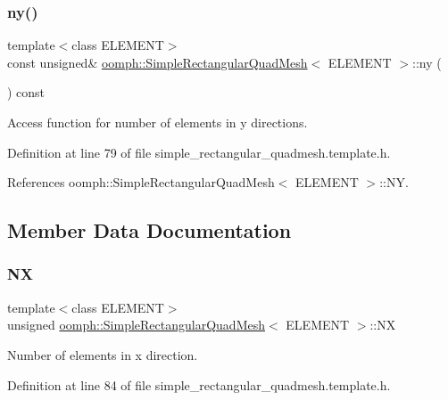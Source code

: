\subsubsection{\texorpdfstring{ny()}{ny()}}
{\footnotesize\ttfamily template$<$class E\+L\+E\+M\+E\+NT$>$ \\
const unsigned\& \hyperlink{classoomph_1_1SimpleRectangularQuadMesh}{oomph\+::\+Simple\+Rectangular\+Quad\+Mesh}$<$ E\+L\+E\+M\+E\+NT $>$\+::ny (\begin{DoxyParamCaption}{ }\end{DoxyParamCaption}) const\hspace{0.3cm}{\ttfamily [inline]}}



Access function for number of elements in y directions. 



Definition at line 79 of file simple\+\_\+rectangular\+\_\+quadmesh.\+template.\+h.



References oomph\+::\+Simple\+Rectangular\+Quad\+Mesh$<$ E\+L\+E\+M\+E\+N\+T $>$\+::\+NY.



\subsection{Member Data Documentation}
\mbox{\label{classoomph_1_1SimpleRectangularQuadMesh_ab6ec406039698222f051d4ec977f1788}} 
\subsubsection{\texorpdfstring{NX}{NX}}
{\footnotesize\ttfamily template$<$class E\+L\+E\+M\+E\+NT$>$ \\
unsigned \hyperlink{classoomph_1_1SimpleRectangularQuadMesh}{oomph\+::\+Simple\+Rectangular\+Quad\+Mesh}$<$ E\+L\+E\+M\+E\+NT $>$\+::NX\hspace{0.3cm}{\ttfamily [private]}}



Number of elements in x direction. 



Definition at line 84 of file simple\+\_\+rectangular\+\_\+quadmesh.\+template.\+h.



